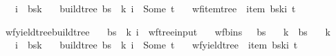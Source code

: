 \begin{isabellebody}
\ \ \ {\isachardoublequoteopen}i\ {\isacharless}{\kern0pt}\ {\isacharbar}{\kern0pt}bs{\isacharbang}{\kern0pt}k{\isacharbar}{\kern0pt}{\isachardoublequoteclose}\isanewline
\ \ \ {\isachardoublequoteopen}build{\isacharunderscore}{\kern0pt}tree{\isacharprime}{\kern0pt}\ bs\ {\isasymomega}\ k\ i\ {\isacharequal}{\kern0pt}\ Some\ t{\isachardoublequoteclose}\isanewline
\ \ \ {\isachardoublequoteopen}wf{\isacharunderscore}{\kern0pt}item{\isacharunderscore}{\kern0pt}tree\ {\isasymG}\ {\isacharparenleft}{\kern0pt}item\ {\isacharparenleft}{\kern0pt}bs{\isacharbang}{\kern0pt}k{\isacharbang}{\kern0pt}i{\isacharparenright}{\kern0pt}{\isacharparenright}{\kern0pt}\ t{\isachardoublequoteclose}%
\isadelimproof
%
\endisadelimproof
%
\isatagproof
%
\endisatagproof
{\isafoldproof}%
%
\isadelimproof
%
\endisadelimproof
%
\begin{isamarkuptext}%
%
\end{isamarkuptext}\isamarkuptrue%
\isamarkupfalse%
\ wf{\isacharunderscore}{\kern0pt}yield{\isacharunderscore}{\kern0pt}tree{\isacharunderscore}{\kern0pt}build{\isacharunderscore}{\kern0pt}tree{\isacharprime}{\kern0pt}{\isacharcolon}{\kern0pt}\isanewline
\ \ \ {\isachardoublequoteopen}{\isacharparenleft}{\kern0pt}bs{\isacharcomma}{\kern0pt}\ {\isasymomega}{\isacharcomma}{\kern0pt}\ k{\isacharcomma}{\kern0pt}\ i{\isacharparenright}{\kern0pt}\ {\isasymin}\ wf{\isacharunderscore}{\kern0pt}tree{\isacharunderscore}{\kern0pt}input{\isachardoublequoteclose}\isanewline
\ \ \ {\isachardoublequoteopen}wf{\isacharunderscore}{\kern0pt}bins\ {\isasymG}\ {\isasymomega}\ bs{\isachardoublequoteclose}\isanewline
\ \ \ {\isachardoublequoteopen}k\ {\isacharless}{\kern0pt}\ {\isacharbar}{\kern0pt}bs{\isacharbar}{\kern0pt}{\isachardoublequoteclose}\isanewline
\ \ \ {\isachardoublequoteopen}k\ {\isasymle}\ {\isacharbar}{\kern0pt}{\isasymomega}{\isacharbar}{\kern0pt}{\isachardoublequoteclose}\isanewline
\ \ \ {\isachardoublequoteopen}i\ {\isacharless}{\kern0pt}\ {\isacharbar}{\kern0pt}bs{\isacharbang}{\kern0pt}k{\isacharbar}{\kern0pt}{\isachardoublequoteclose}\isanewline
\ \ \ {\isachardoublequoteopen}build{\isacharunderscore}{\kern0pt}tree{\isacharprime}{\kern0pt}\ bs\ {\isasymomega}\ k\ i\ {\isacharequal}{\kern0pt}\ Some\ t{\isachardoublequoteclose}\isanewline
\ \ \ {\isachardoublequoteopen}wf{\isacharunderscore}{\kern0pt}yield{\isacharunderscore}{\kern0pt}tree\ {\isasymomega}\ {\isacharparenleft}{\kern0pt}item\ {\isacharparenleft}{\kern0pt}bs{\isacharbang}{\kern0pt}k{\isacharbang}{\kern0pt}i{\isacharparenright}{\kern0pt}{\isacharparenright}{\kern0pt}\ t{\isachardoublequoteclose}%

\end{isabellebody}

